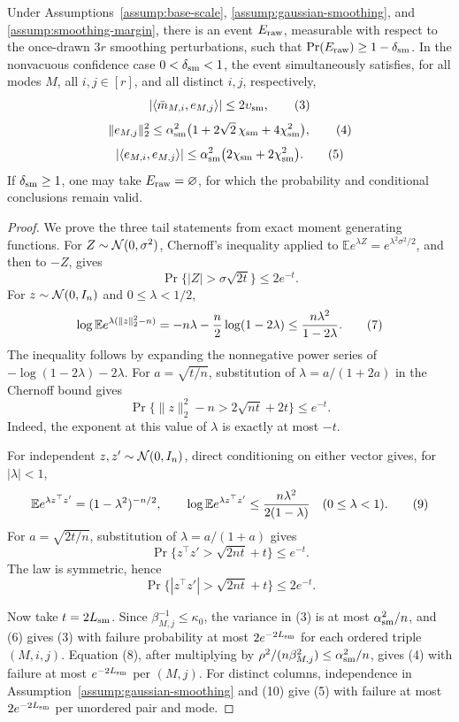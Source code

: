 \begin{lemma}\label{lem:step-001-raw-smoothing}
Under Assumptions~\ref{assump:base-scale},
\ref{assump:gaussian-smoothing}, and
\ref{assump:smoothing-margin}, there is an event
$E_{\rm raw}$, measurable with respect to the once-drawn $3r$
smoothing perturbations, such that
$\Pr(E_{\rm raw})\ge1-\delta_{\rm sm}$. In the nonvacuous confidence
case $0<\delta_{\rm sm}<1$, the event simultaneously satisfies, for all
modes $M$, all $i,j\in[r]$, and all distinct $i,j$, respectively,
\[
|\langle\bar m_{M,i},e_{M,j}\rangle|
\le2\upsilon_{\rm sm},
\tag{3}
\]
\[
\|e_{M,j}\|_2^2\le
\alpha_{\rm sm}^2
\bigl(1+2\sqrt2\,\chi_{\rm sm}+4\chi_{\rm sm}^2\bigr),
\tag{4}
\]
\[
|\langle e_{M,i},e_{M,j}\rangle|
\le\alpha_{\rm sm}^2
\bigl(2\chi_{\rm sm}+2\chi_{\rm sm}^2\bigr).
\tag{5}
\]
If $\delta_{\rm sm}\ge1$, one may take $E_{\rm raw}=\varnothing$,
for which the probability and conditional conclusions remain valid.

\begin{proof}
We prove the three tail statements from exact moment generating functions.
For $Z\sim {\cal N}(0,\sigma^2)$, Chernoff's inequality applied to
$\mathbb E e^{\lambda Z}=e^{\lambda^2\sigma^2/2}$, and then to
$-Z$, gives
\[
\Pr\{|Z|>\sigma\sqrt{2t}\}\le2e^{-t}.
\tag{6}
\]
For $z\sim {\cal N}(0,I_n)$ and $0\le\lambda<1/2$,
\[
\log\mathbb E e^{\lambda(\|z\|_2^2-n)}
=-n\lambda-{n\over2}\log(1-2\lambda)
\le {n\lambda^2\over1-2\lambda}.
\tag{7}
\]
The inequality follows by expanding the nonnegative power series of
$-\log(1-2\lambda)-2\lambda$. For $a=\sqrt{t/n}$, substitution of
$\lambda=a/(1+2a)$ in the Chernoff bound gives
\[
\Pr\{\|z\|_2^2-n>2\sqrt{nt}+2t\}\le e^{-t}.
\tag{8}
\]
Indeed, the exponent at this value of $\lambda$ is exactly at most
$-t$.

For independent $z,z'\sim{\cal N}(0,I_n)$, direct conditioning on either
vector gives, for $|\lambda|<1$,
\[
\mathbb E e^{\lambda z^\top z'}=(1-\lambda^2)^{-n/2},
\qquad
\log\mathbb E e^{\lambda z^\top z'}
\le {n\lambda^2\over2(1-\lambda)}
\quad(0\le\lambda<1).
\tag{9}
\]
For $a=\sqrt{2t/n}$, substitution of
$\lambda=a/(1+a)$ gives
\[
\Pr\{z^\top z'>\sqrt{2nt}+t\}\le e^{-t}.
\]
The law is symmetric, hence
\[
\Pr\{|z^\top z'|>\sqrt{2nt}+t\}\le2e^{-t}.
\tag{10}
\]

Now take $t=2L_{\rm sm}$. Since
$\beta_{M,j}^{-1}\le\kappa _0$, the variance in (3) is at most
$\alpha_{\rm sm}^2/n$, and (6) gives (3) with failure probability at
most $2e^{-2L_{\rm sm}}$ for each ordered triple $(M,i,j)$.
Equation (8), after multiplying by
$\rho^2/(n\beta_{M,j}^2)\le\alpha_{\rm sm}^2/n$, gives (4) with failure
at most $e^{-2L_{\rm sm}}$ per $(M,j)$. For distinct columns,
independence in Assumption~\ref{assump:gaussian-smoothing} and (10)
give (5) with failure at most $2e^{-2L_{\rm sm}}$ per unordered pair and
mode.


\end{proof}
\end{lemma}
